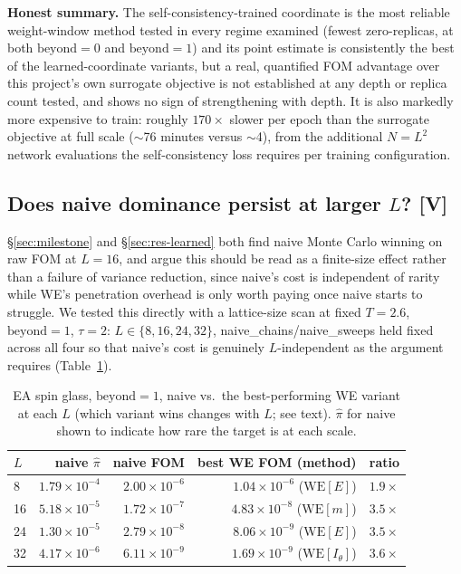 \documentclass[a4paper,fleqn]{cas-sc}
\begin{document}
\textbf{Honest summary.} The self-consistency-trained coordinate is the most reliable
weight-window method tested in every regime examined (fewest zero-replicas, at both
$\mathrm{beyond}=0$ and $\mathrm{beyond}=1$) and its point estimate is consistently the
best of the learned-coordinate variants, but a real, quantified FOM advantage over this
project's own surrogate objective is not established at any depth or replica count tested,
and shows no sign of strengthening with depth. It is also markedly more expensive to
train: roughly $170\times$ slower per epoch than the surrogate objective at full scale
($\sim$76 minutes versus $\sim$4), from the additional $N=L^2$ network evaluations the
self-consistency loss requires per training configuration.

\subsection{Does naive dominance persist at larger $L$? \textbf{[V]}}\label{sec:lscaling}
\S\ref{sec:milestone} and \S\ref{sec:res-learned} both find naive Monte Carlo winning on
raw FOM at $L=16$, and argue this should be read as a finite-size effect rather than a
failure of variance reduction, since naive's cost is independent of rarity while WE's
penetration overhead is only worth paying once naive starts to struggle. We tested this
directly with a lattice-size scan at fixed $T=2.6$, $\mathrm{beyond}=1$, $\tau=2$: $L\in
\{8,16,24,32\}$, naive\_chains/naive\_sweeps held fixed across all four so that naive's
cost is genuinely $L$-independent as the argument requires (Table~\ref{tab:lscaling}).

\begin{table}[H]
\centering\small
\caption{EA spin glass, $\mathrm{beyond}=1$, naive vs.\ the best-performing WE variant at
	each $L$ (which variant wins changes with $L$; see text). $\hat\pi$ for naive shown to
	indicate how rare the target is at each scale.}
\label{tab:lscaling}
\begin{tabular}{lrrrr}
	\toprule
	$L$ & naive $\hat\pi$ & naive FOM & best WE FOM (method) & ratio \\
	\midrule
	8 & $1.79\times10^{-4}$ & $2.00\times10^{-6}$ & $1.04\times10^{-6}$ ($\mathrm{WE}[E]$) & $1.9\times$ \\
	16 & $5.18\times10^{-5}$ & $1.72\times10^{-7}$ & $4.83\times10^{-8}$ ($\mathrm{WE}[m]$) & $3.5\times$ \\
	24 & $1.30\times10^{-5}$ & $2.79\times10^{-8}$ & $8.06\times10^{-9}$ ($\mathrm{WE}[E]$) & $3.5\times$ \\
	32 & $4.17\times10^{-6}$ & $6.11\times10^{-9}$ & $1.69\times10^{-9}$ ($\mathrm{WE}[I_\theta]$) & $3.6\times$ \\
	\bottomrule
\end{tabular}
\end{table}
\end{document}
